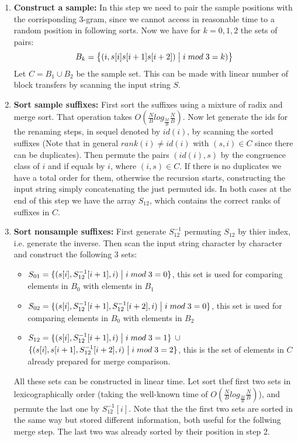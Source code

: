 \documentclass[a4paper]{article}
\begin{document}
\begin{enumerate}
\item \textbf{Construct a sample: } In this step we need to pair the sample positions with the corrisponding 3-gram, since we cannot access in reasonable time to a random position in following sorts. Now we have for $k = 0,1,2$ the sets of pairs:
$$B_k = \bigl\{(i, s[i]s[i+1]s[i+2]) \bigm| i \; mod \; 3 = k)\bigr\}$$ 
Let $C = B_1 \cup B_2$ be the sample set.
This can be made with linear number of block transfers by scanning the input string $S$.

\item \textbf{Sort sample suffixes: } First sort the suffixes using a mixture of radix and merge sort. That operation takes $O(\frac{N}{B} log_{\frac{M}{B}} \frac{N}{B})$.
Now let generate the ids for the renaming steps, in sequel denoted by $id(i)$, by scanning the sorted suffixes (Note that in general $rank(i) \neq id(i)$ with $(s, i) \in C$ since there can be duplicates). 
Then permute the pairs $(id(i), s)$ by the congruence class of $i$ and if equals by $i$, where $(i, s) \in C$.
If there is no duplicates we have a total order for them, otherwise the recursion starts, constructing the input string simply concatenating the just permuted ids.
In both cases at the end of this step we have the array $S_{12}$, which contains the correct ranks of suffixes in $C$.

\item \textbf{Sort nonsample suffixes: } 
First generate $S_{12}^{-1}$ permuting $S_{12}$ by thier index, i.e. generate the inverse.
Then scan the input string character by character and construct the following $3$ sets:
\begin{itemize}
\item $S_{01} = \{(s[i], S_{12}^{-1}[i+1], i) \bigm| i \; mod \; 3 = 0\}$, this set is used for comparing elements in $B_0$ with elements in $B_1$ 
\item $S_{02} = \{(s[i], S_{12}^{-1}[i+1], S_{12}^{-1}[i+2], i) \bigm| i \; mod \; 3 = 0\}$, this set is used for comparing elements in $B_0$ with elements in $B_2$
\item $S_{12} = \{(s[i], S_{12}^{-1}[i+1], i) \bigm| i \; mod \; 3 = 1\}$ $\cup$ $\{(s[i], s[i+1], S_{12}^{-1}[i+2], i) \bigm| i \; mod \; 3 = 2\}$, this is the set of elements in $C$ already prepared for merge comparison.
\end{itemize}
All these sets can be constructed in linear time. Let sort thef first two sets in lexicographically order (taking the well-known time of $O(\frac{N}{B} log_{\frac{M}{B}} \frac{N}{B})$), and permute the last one by $S_{12}^{-1}[i]$. Note that the the first two sets are sorted in the same way but stored different information, both useful for the follwing merge step. The last two was already sorted by their position in step 2.


\end{enumerate}
\end{document}
